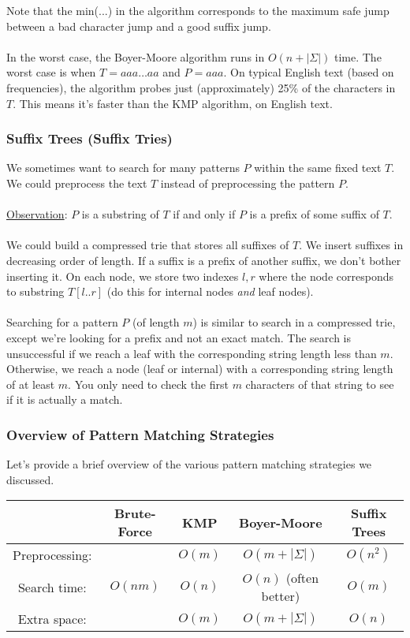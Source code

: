 \documentclass[]{article}
\theoremstyle{definition}
\begin{document}
				Note that the min(...) in the algorithm corresponds to the maximum safe jump between a bad character jump and a good suffix jump.
				\\ \\
				In the worst case, the Boyer-Moore algorithm runs in $O(n + |\Sigma|)$ time. The worst case is when $T = aaa \ldots aa$ and $P = aaa$. On typical English text (based on frequencies), the algorithm probes just (approximately) 25\% of the characters in $T$. This means it's faster than the KMP algorithm, on English text.

			\subsubsection{Suffix Trees (Suffix Tries)}
				We sometimes want to search for many patterns $P$ within the same fixed text $T$. We could preprocess the text $T$ instead of preprocessing the pattern $P$.
				\\ \\
				\underline{Observation}: $P$ is a substring of $T$ if and only if $P$ is a prefix of some suffix of $T$.
				\\ \\
				We could build a compressed trie that stores all suffixes of $T$. We insert suffixes in decreasing order of length. If a suffix is a prefix of another suffix, we don't bother inserting it. On each node, we store two indexes $l, r$ where the node corresponds to substring $T[l..r]$ (do this for internal nodes \emph{and} leaf nodes).
				\\ \\
				Searching for a pattern $P$ (of length $m$) is similar to search in a compressed trie, except we're looking for a prefix and not an exact match. The search is unsuccessful if we reach a leaf with the corresponding string length less than $m$. Otherwise, we reach a node (leaf or internal) with a corresponding string length of at least $m$. You only need to check the first $m$ characters of that string to see if it is actually a match.

			\subsubsection{Overview of Pattern Matching Strategies}
				Let's provide a brief overview of the various pattern matching strategies we discussed.

				\begin{center}
					\begin{tabular}{|c||c|c|c|c|}
						\hline
						& Brute-Force & KMP & Boyer-Moore & Suffix Trees \\ \hline
						Preprocessing: & & $O(m)$ & $O(m + |\Sigma|)$ & $O(n^2)$ \\
						Search time: & $O(nm)$ & $O(n)$ & $O(n)$ (often better) & $O(m)$ \\
						Extra space: & & $O(m)$ & $O(m + |\Sigma|)$ & $O(n)$ \\ \hline
					\end{tabular}
				\end{center}
\end{document}

